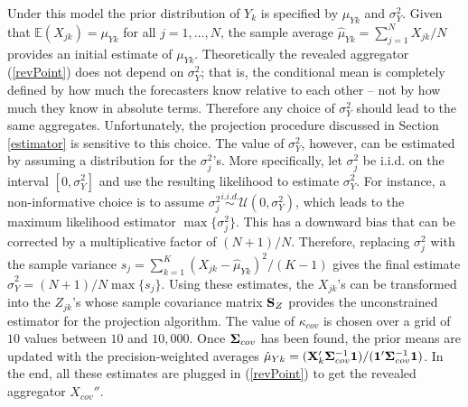 \documentclass[11pt]{article}
\newcommand{\E}{\mathbb{E}}
\theoremstyle{definition}
\theoremstyle{definition}
\def\one{{\bf 1}}
\def\bSigma{{\bf \Sigma}}
\def\X{{\bf X}}
\def\SS{{\bf S}}
\def\E{{\mathbb E}}
\begin{document}
Under this model the prior distribution of $Y_k$ is specified by $\mu_{Yk}$ and $\sigma_Y^2$. Given that $\E(X_{jk}) = \mu_{Yk}$ for all $j = 1, \dots, N$, the sample average $\hat{\mu}_{Yk} = \sum_{j=1}^N X_{jk}/N$ provides an initial estimate of $\mu_{Yk}$. Theoretically the revealed aggregator (\ref{revPoint}) does not depend on $\sigma_Y^2$; that is, the conditional mean is completely defined by how much the forecasters know relative to each other -- not by how much they know in absolute terms. Therefore any choice of $\sigma_Y^2$ should lead to the same aggregates. Unfortunately, the projection procedure discussed in Section \ref{estimator} is sensitive to this choice. The value of $\sigma_Y^2$, however, can be estimated by assuming a distribution for the $\sigma_j^2$'s. More specifically, let $\sigma_j^2$ be i.i.d. on the interval $[0,\sigma_Y^2]$ and use the resulting likelihood to estimate $\sigma_Y^2$. For instance, a non-informative choice is to assume $\sigma_j^2 \stackrel{i.i.d.}{\sim} \mathcal{U}(0,\sigma_Y^2)$, which leads to the maximum likelihood estimator $\max\{\sigma_j^2\}$. This has a downward bias that can be corrected by a multiplicative factor of $(N+1)/N$. Therefore, replacing $\sigma_j^2$ with the sample variance  $s_j = \sum_{k=1}^K (X_{jk}-\hat{\mu}_{Yk})^2/(K-1)$ gives the final estimate $\hat{\sigma}_Y^2 = (N+1)/N\max\{s_j\}$. Using these estimates, the $X_{jk}$'s can be transformed into the $Z_{jk}$'s whose sample covariance matrix $\SS_Z$ provides the unconstrained estimator for the projection algorithm.  The value of $\kappa_{cov}$ is chosen over a grid of $10$ values between $10$ and $10,000$. Once $\bSigma_{cov}$ has been found, the prior means are updated with the precision-weighted averages $\hat{\mu}_{Yk} = (\X_{k}' \bSigma_{cov}^{-1} \one)/(\one' \bSigma_{cov}^{-1} \one)$. In the end, all these estimates are plugged in (\ref{revPoint}) to get the revealed aggregator $X_{cov}''$.
\end{document}
